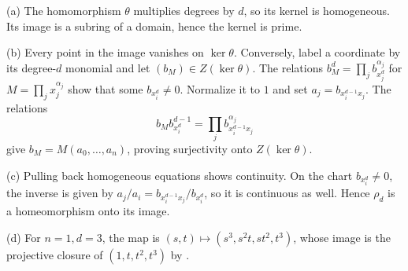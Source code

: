 (a) The homomorphism $\theta$ multiplies degrees by $d$, so its kernel is homogeneous. Its image is a subring of a domain, hence the kernel is prime.

(b) Every point in the image vanishes on $\ker\theta$. Conversely, label a coordinate by its degree-$d$ monomial and let $(b_M)\in Z(\ker\theta)$. The relations $b_M^d=\prod_j b_{x_j^d}^{\alpha_j}$ for $M=\prod_jx_j^{\alpha_j}$ show that some $b_{x_i^d}\ne0$. Normalize it to $1$ and set $a_j=b_{x_i^{d-1}x_j}$. The relations
\[b_M b_{x_i^d}^{d-1}=\prod_j b_{x_i^{d-1}x_j}^{\alpha_j}\]
 give $b_M=M(a_0,\ldots,a_n)$, proving surjectivity onto $Z(\ker\theta)$.

(c) Pulling back homogeneous equations shows continuity. On the chart $b_{x_i^d}\ne0$, the inverse is given by $a_j/a_i=b_{x_i^{d-1}x_j}/b_{x_i^d}$, so it is continuous as well. Hence $\rho_d$ is a homeomorphism onto its image.

(d) For $n=1,d=3$, the map is $(s,t)\mapsto(s^3,s^2t,st^2,t^3)$, whose image is the projective closure of $(1,t,t^2,t^3)$ by .
